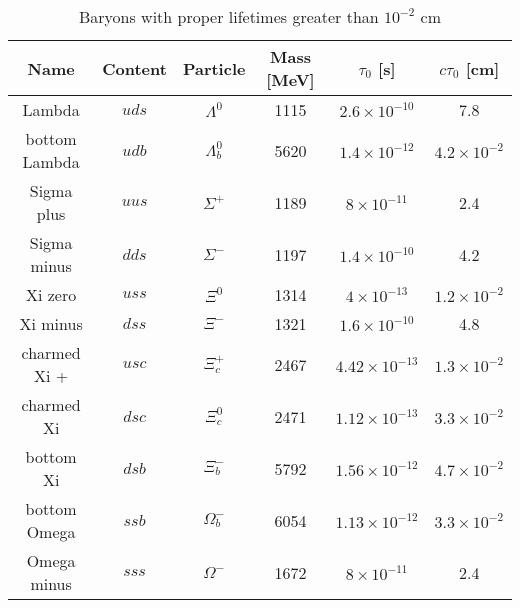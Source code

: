 \begin{table}
\begin{center}
\begin{tabular}{cccccc}
\textbf{Name}          & \textbf{Content} & \textbf{Particle}      & \textbf{Mass} [MeV] &  $\tau_{0}$ [s] & $c\tau_{0}$ [cm] \\
\hline 
Lambda        & $uds$   & $\Lambda^0$   & 1115       & $2.6 \times 10^{-10}$    & 7.8                  \\
bottom Lambda & $udb$   & $\Lambda^0_b$ & 5620       & $1.4 \times 10^{-12}$    & $4.2 \times 10^{-2}$ \\
\hline
Sigma plus    & $uus$   & $\Sigma^{+}$  & 1189       & $8 \times 10^{-11}$      & 2.4                  \\
Sigma minus   & $dds$   & $\Sigma^{-}$  & 1197       & $1.4\times 10^{-10}$     & 4.2                  \\
\hline 
Xi zero       & $uss$   & $\Xi^0$       & 1314       & $4 \times 10^{-13}$      & $1.2 \times 10^{-2}$ \\
Xi minus      & $dss$   & $\Xi^-$       & 1321       & $1.6 \times 10^{-10}$    & 4.8                  \\
charmed Xi +  & $usc$   & $\Xi^{+}_c$   & 2467       & $4.42 \times 10^{-13}$   & $1.3 \times 10^{-2}$ \\
charmed Xi    & $dsc$   & $\Xi^0_c$     & 2471       & $1.12 \times 10^{-13}$   & $3.3 \times 10^{-2}$ \\
bottom Xi     & $dsb$   & $\Xi^-_b$     & 5792       & $1.56 \times 10^{-12}$   & $4.7 \times 10^{-2}$ \\
\hline
bottom Omega  & $ssb$   & $\Omega_b^-$  & 6054       & $1.13 \times 10^{-12}$   & $3.3 \times 10^{-2}$ \\
Omega minus   & $sss$   & $\Omega^-$    & 1672       & $8 \times 10^{-11}$      & 2.4                  \\
\end{tabular}
\end{center}
\caption{Baryons with proper lifetimes greater than $10^{-2}$ cm} 
\label{tab:baryons}
\end{table}
